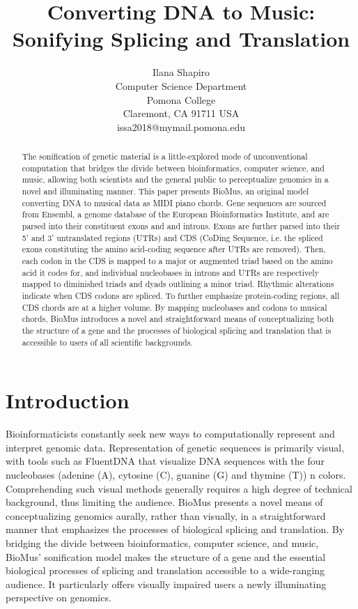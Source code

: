 \documentclass[letterpaper]{article}
\title{Converting DNA to Music: Sonifying Splicing and Translation}
\author{Ilana Shapiro\\
Computer Science Department\\
Pomona College\\
Claremont, CA 91711 USA\\
issa2018@mymail.pomona.edu\\
}
\begin{document}
 
\maketitle
\begin{abstract}
The sonification of genetic material is a little-explored mode of unconventional computation that bridges the divide between bioinformatics, computer science, and music, allowing both scientists and the general public to perceptualize genomics in a novel and illuminating manner. This paper presents BioMus, an original model converting DNA to musical data as MIDI piano chords. Gene sequences are sourced from Ensembl, a genome database of the European Bioinformatics Institute, and are parsed into their constituent exons and and introns. Exons are further parsed into their 5' and 3' untranslated regions (UTRs) and CDS (CoDing Sequence, i.e. the spliced exons constituting the amino acid-coding sequence after UTRs are removed). Then, each codon in the CDS is mapped to a major or augmented triad based on the amino acid it codes for, and individual nucleobases in introns and UTRs are respectively mapped to diminished triads and dyads outlining a minor triad. Rhythmic alterations indicate when CDS codons are spliced. To further emphasize protein-coding regions, all CDS chords are at a higher volume. By mapping nucleobases and codons to musical chords, BioMus introduces a novel and straightforward means of conceptualizing both the structure of a gene and the processes of biological splicing and translation that is accessible to users of all scientific backgrounds.
\end{abstract}

\section{Introduction}
Bioinformaticists constantly seek new ways to computationally represent and interpret genomic data. Representation of genetic sequences is primarily visual, with tools such as FluentDNA that visualize DNA sequences with the four nucleobases (adenine (A), cytosine (C), guanine (G) and thymine (T)) n colors.
Comprehending such visual methods generally requires a high degree of technical background, thus limiting the audience. BioMus presents a novel means of conceptualizing genomics aurally, rather than visually, in a straightforward manner that emphasizes the processes of biological splicing and translation. By bridging the divide between bioinformatics, computer science, and music, BioMus' sonification model makes the structure of a gene and the essential biological processes of splicing and translation accessible to a wide-ranging audience. It particularly offers visually impaired users a newly illuminating perspective on genomics.
\end{document}
